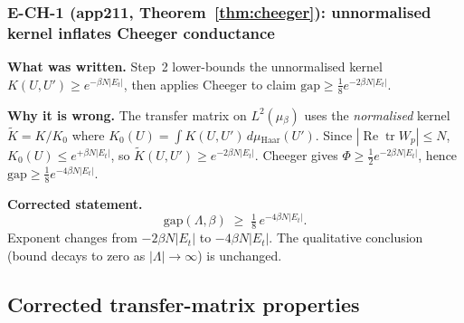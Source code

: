 \subsubsection*{E-CH-1 (app211, Theorem~\ref{thm:cheeger}): unnormalised kernel inflates Cheeger conductance}

\noindent{}\textbf{What was written.}
Step~2 lower-bounds the unnormalised kernel $K(U,U')\ge{}e^{-\beta{} N|E_t|}$,
then applies Cheeger to claim $\mathrm{gap}\ge{}\tfrac{1}{8}e^{-2\beta{} N|E_t|}$.

\smallskip{}
\noindent{}\textbf{Why it is wrong.}
The transfer matrix on $L^2(\mu{}_\beta{})$ uses the \emph{normalised} kernel $\tilde{K}=K/K_0$ where
$K_0(U)=\int{} K(U,U')\,{}d\mu{}_{\mathrm{Haar}}(U')$.
Since $|\operatorname{Re}\operatorname{tr}W_p|\le{} N$,
$K_0(U)\le{}e^{+\beta{} N|E_t|}$, so $\tilde{K}(U,U')\ge{}e^{-2\beta{} N|E_t|}$.
Cheeger gives $\Phi{}\ge{}\tfrac{1}{2}e^{-2\beta{} N|E_t|}$, hence $\mathrm{gap}\ge{}\tfrac{1}{8}e^{-4\beta{} N|E_t|}$.

\smallskip{}
\noindent{}\textbf{Corrected statement.}
\begin{equation*}
  \mathrm{gap}(\Lambda{},\beta{}) \;{}\ge{}\;{} \tfrac{1}{8}\,{}e^{-4\beta{} N|E_t|}.
\end{equation*}
Exponent changes from $-2\beta{} N|E_t|$ to $-4\beta{} N|E_t|$.
The qualitative conclusion (bound decays to zero as $|\Lambda{}|\to{}\infty{}$) is unchanged.

\subsection{Corrected transfer-matrix properties}
\label{ssec:new_tm212}

